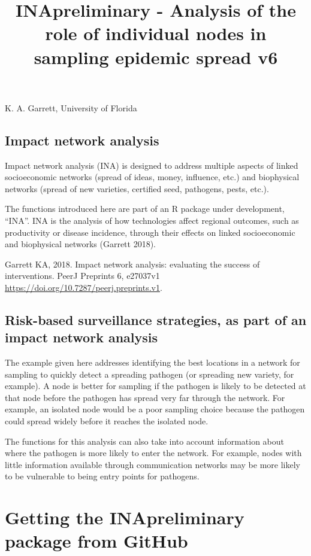 \documentclass[]{article}
\title{INApreliminary - Analysis of the role of individual nodes in sampling
epidemic spread v6}
\author{}
\date{}
\begin{document}
\maketitle

K. A. Garrett, University of Florida

\subsection{Impact network analysis}\label{impact-network-analysis}

Impact network analysis (INA) is designed to address multiple aspects of
linked socioeconomic networks (spread of ideas, money, influence, etc.)
and biophysical networks (spread of new varieties, certified seed,
pathogens, pests, etc.).

The functions introduced here are part of an R package under
development, ``INA''. INA is the analysis of how technologies affect
regional outcomes, such as productivity or disease incidence, through
their effects on linked socioeconomic and biophysical networks (Garrett
2018).

Garrett KA, 2018. Impact network analysis: evaluating the success of
interventions. PeerJ Preprints 6, e27037v1
\url{https://doi.org/10.7287/peerj.preprints.v1}.

\subsection{Risk-based surveillance strategies, as part of an impact
network
analysis}\label{risk-based-surveillance-strategies-as-part-of-an-impact-network-analysis}

The example given here addresses identifying the best locations in a
network for sampling to quickly detect a spreading pathogen (or
spreading new variety, for example). A node is better for sampling if
the pathogen is likely to be detected at that node before the pathogen
has spread very far through the network. For example, an isolated node
would be a poor sampling choice because the pathogen could spread widely
before it reaches the isolated node.

The functions for this analysis can also take into account information
about where the pathogen is more likely to enter the network. For
example, nodes with little information available through communication
networks may be more likely to be vulnerable to being entry points for
pathogens.

\section{Getting the INApreliminary package from
GitHub}\label{getting-the-inapreliminary-package-from-github}
\end{document}
